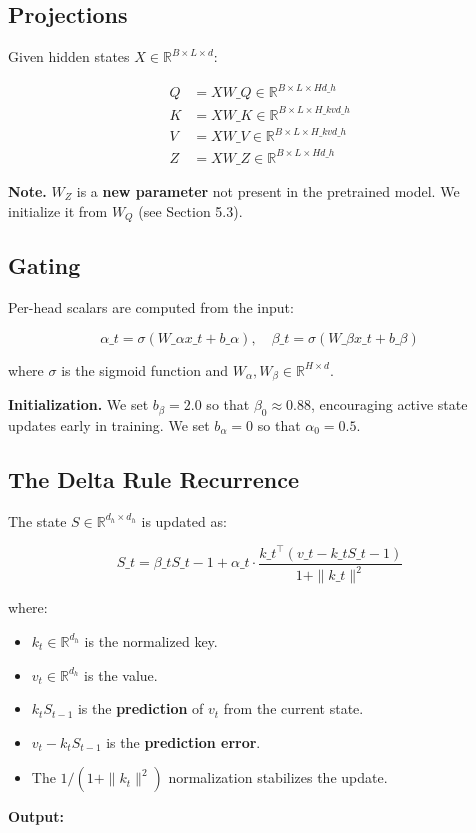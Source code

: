 \subsection{Projections}

Given hidden states $X \in \mathbb{R}^{B \times L \times d}$:

\[
\begin{aligned}
Q &= X W\_Q \in \mathbb{R}^{B \times L \times H d\_h} \\
K &= X W\_K \in \mathbb{R}^{B \times L \times H\_{kv} d\_h} \\
V &= X W\_V \in \mathbb{R}^{B \times L \times H\_{kv} d\_h} \\
Z &= X W\_Z \in \mathbb{R}^{B \times L \times H d\_h}
\end{aligned}
\tag{4.1}
\]

\textbf{Note.} $W_Z$ is a \textbf{new parameter} not present in the pretrained model. 
We initialize it from $W_Q$ (see Section 5.3).

\subsection{Gating}

Per-head scalars are computed from the input:

\[
\alpha\_t = \sigma(W\_\alpha x\_t + b\_\alpha), \quad
\beta\_t = \sigma(W\_\beta x\_t + b\_\beta)
\tag{4.2}
\]

where $\sigma$ is the sigmoid function and $W_\alpha, W_\beta \in \mathbb{R}^{H \times d}$.

\textbf{Initialization.} We set $b_\beta = 2.0$ so that $\beta_0 \approx 0.88$, 
encouraging active state updates early in training. We set $b_\alpha = 0$ 
so that $\alpha_0 = 0.5$.

\subsection{The Delta Rule Recurrence}

The state $S \in \mathbb{R}^{d_h \times d_h}$ is updated as:

\[
\boxed{
S\_t = \beta\_t S\_{t-1} + \alpha\_t \cdot \frac{k\_t^\top (v\_t - k\_t S\_{t-1})}{1 + \|k\_t\|^2}
}
\tag{4.3}
\]

where:
\begin{itemize}
\item $k_t \in \mathbb{R}^{d_h}$ is the normalized key.
\item $v_t \in \mathbb{R}^{d_h}$ is the value.
\item $k_t S_{t-1}$ is the \textbf{prediction} of $v_t$ from the current state.
\item $v_t - k_t S_{t-1}$ is the \textbf{prediction error}.
\item The $1 / (1 + \|k_t\|^2)$ normalization stabilizes the update.

\end{itemize}
\textbf{Output:}

